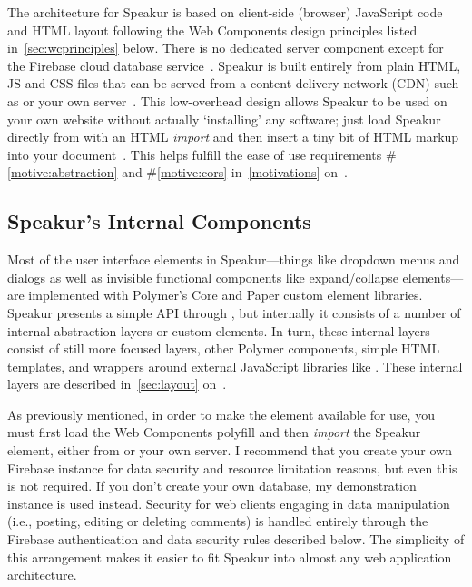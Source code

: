 The architecture for Speakur is based on client-side (browser) JavaScript code and HTML layout following the Web Components design principles listed in~\cref{sec:wcprinciples} below. 
There is no dedicated server component except for the Firebase cloud database service~\cite{firebasecontributors2015}.
Speakur is built entirely from plain HTML, JS and CSS files that can be served from a content delivery network (CDN) 
such as  or your own server~\cite{landers2015-d}.
This low-overhead design allows Speakur to be used on your own website without actually `installing' any software;
just load Speakur directly from  with an HTML \textit{import}
and then insert a tiny bit of HTML markup into your document~\cite{landers2015-d}.
This helps fulfill the ease of use requirements 
\#\ref{motive:abstraction} and \#\ref{motive:cors}
in~\cref{motivations} on~.

\subsection{Speakur's Internal Components}
Most of the user interface elements in Speakur---things like dropdown menus and dialogs as well as invisible functional components like expand/collapse elements---are implemented with Polymer's Core and Paper custom element libraries.
Speakur presents a simple API through ,
but internally it consists of a number of internal abstraction layers or custom elements.
In turn, these internal layers consist of still more focused layers, other Polymer components, 
simple HTML templates, 
and wrappers around external JavaScript libraries 
like .
These internal layers are described in~\cref{sec:layout} on~.

As previously mentioned, in order to make the 
 element available for use, 
you must first load the Web Components polyfill and then \textit{import} the Speakur element, 
either from  or your own server.
I recommend that you create your own Firebase instance for data security and resource limitation reasons, but even this is not required. 
If you don't create your own database, my demonstration instance is used instead.
Security for web clients engaging in data manipulation 
(i.e., posting, editing or deleting comments) 
is handled entirely through the Firebase authentication 
and data security rules described below.
The simplicity of this arrangement makes it easier to fit Speakur into almost any web application architecture.

